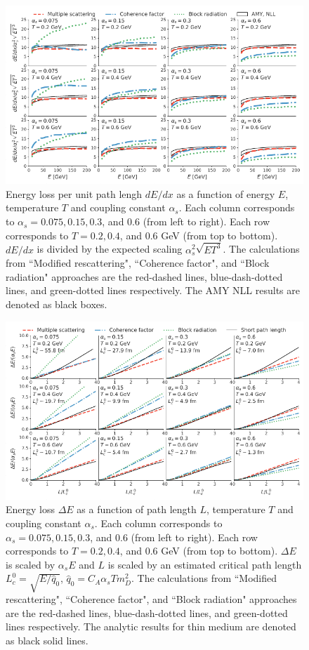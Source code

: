 \documentclass[aps, prc, reprint, amsmath, groupedaddress, nofootinbib]{revtex4-1}
\begin{document}
{\begin{figure}
\includegraphics[width=\textwidth]{Eloss_infinite.pdf}
\caption{Energy loss per unit path lengh $dE/dx$ as a function of energy $E$, temperature $T$ and coupling constant $\alpha_s$. Each column corresponds to $\alpha_s = 0.075, 0.15, 0.3$, and $0.6$ (from left to right). Each row corresponds to $T = 0.2, 0.4$, and $0.6$ GeV (from top to bottom). $dE/dx$ is divided by the expected scaling $\alpha_s^2 \sqrt{ET^3}$. The calculations from ``Modified rescattering", ``Coherence factor", and ``Block radiation" approaches are the red-dashed lines, blue-dash-dotted lines, and green-dotted lines respectively. The AMY NLL results are denoted as black boxes.}
\label{fig:eloss-inf}
\end{figure}

\begin{figure}
\includegraphics[width=\textwidth]{Eloss_Ldep.pdf}
\caption{Energy loss $\Delta E$ as a function of path length $L$, temperature $T$ and coupling constant $\alpha_s$. Each column corresponds to $\alpha_s = 0.075, 0.15, 0.3$, and $0.6$ (from left to right). Each row corresponds to $T = 0.2, 0.4$, and $0.6$ GeV (from top to bottom). $\Delta E$ is scaled by $\alpha_s E$ and $L$ is scaled by an estimated critical path length $L_c^0 = \sqrt{E/\hat{q}_0}$, $\hat{q}_0 = C_A \alpha_s T m_D^2$. The calculations from ``Modified rescattering", ``Coherence factor", and ``Block radiation" approaches are the red-dashed lines, blue-dash-dotted lines, and green-dotted lines respectively. The analytic results for thin medium are denoted as black solid lines.}
\label{fig:eloss-ldep}
\end{figure}

}
\end{document}
